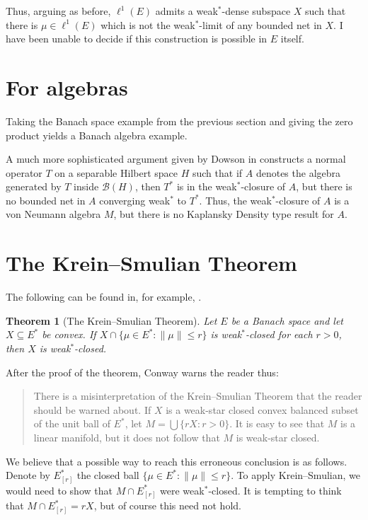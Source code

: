 \documentclass[a4paper,12pt]{article}
\theoremstyle{plain}
\newtheorem{theorem}[proposition]{Theorem}
\theoremstyle{definition}
\newcommand{\mc}{\mathcal}
\begin{document}
Thus, arguing as before, $\ell^1(E)$ admits a weak$^*$-dense subspace $X$ such that there is
$\mu\in \ell^1(E)$ which is not the weak$^*$-limit of any bounded net in $X$.  I have
been unable to decide if this construction is possible in $E$ itself.



\section{For algebras}

Taking the Banach space example from the previous section and giving the zero product yields a
Banach algebra example.

A much more sophisticated argument given by Dowson in \cite{dowson} constructs a normal operator
$T$ on a separable Hilbert space $H$ such that if $A$ denotes the algebra generated by $T$ inside
$\mc B(H)$, then $T^*$ is in the weak$^*$-closure of $A$, but there is no bounded net in $A$
converging weak$^*$ to $T^*$.  Thus, the weak$^*$-closure of $A$ is a von Neumann algebra $M$,
but there is no Kaplansky Density type result for $A$.





\section{The Krein--Smulian Theorem}

The following can be found in, for example, \cite[Chapter~5, Section~12]{conway}.

\begin{theorem}[The Krein--Smulian Theorem]
Let $E$ be a Banach space and let $X\subseteq E^*$ be convex.  If $X\cap\{\mu\in E^*:\|\mu\|\leq r\}$
is weak$^*$-closed for each $r> 0$, then $X$ is weak$^*$-closed.
\end{theorem}

After the proof of the theorem, Conway warns the reader thus:

\begin{quote}
There is a misinterpretation of the Krein--Smulian Theorem that the reader should be warned about.
If $X$ is a weak-star closed convex balanced subset of the unit ball of $E^*$, let $M = \bigcup
\{ rX:r>0\}$.  It is easy to see that $M$ is a linear manifold, but it does not follow that $M$
is weak-star closed.
\end{quote}

We believe that a possible way to reach this erroneous conclusion is as follows.  Denote by
$E^*_{[r]}$ the closed ball $\{\mu\in E^* : \|\mu\|\leq r\}$.  To apply Krein--Smulian, we would
need to show that $M \cap E^*_{[r]}$ were weak$^*$-closed.  It is tempting to think that
$M \cap E^*_{[r]} = rX$, but of course this need not hold.
\end{document}
